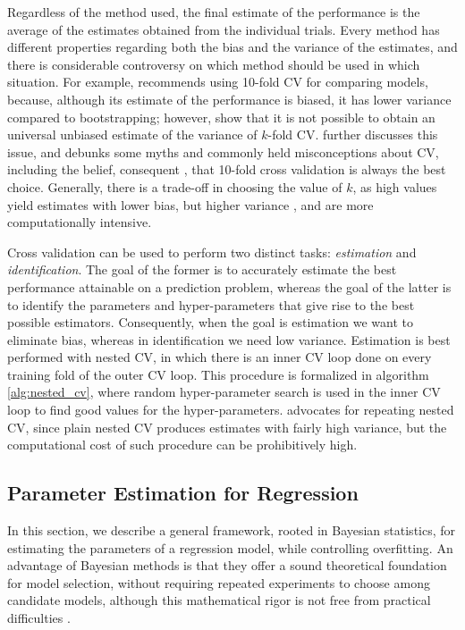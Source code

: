 \documentclass[a4paper,11pt]{kth-mag}
\begin{document}
Regardless of the method used, the final estimate of the performance is the average of the estimates obtained from the individual trials. Every method has different properties regarding both the bias and the variance of the estimates, and there is considerable controversy on which method should be used in which situation. For example, \cite{cv_bootstrap} recommends using 10-fold CV for comparing models, because, although its estimate of the performance is biased, it has lower variance compared to bootstrapping; however, \cite{no_unbiased_cv} show that it is not possible to obtain an universal unbiased estimate of the variance of $k$-fold CV. \cite{cvmyths} further discusses this issue, and debunks some myths and commonly held misconceptions about CV, including the belief, consequent \cite{cv_bootstrap}, that 10-fold cross validation is always the best choice. Generally, there is a trade-off in choosing the value of $k$, as high values yield estimates with lower bias, but higher variance \citep{cv_survey}, and are more computationally intensive.

Cross validation can be used to perform two distinct tasks: \emph{estimation} and \emph{identification}. The goal of the former is to accurately estimate the best performance attainable on a prediction problem, whereas the goal of the latter is to identify the parameters and hyper-parameters that give rise to the best possible estimators. Consequently, when the goal is estimation we want to eliminate bias, whereas in identification we need low variance. Estimation is best performed with nested CV\citep{nested_cv_stone,nested_cv_varma}, in which there is an inner CV loop done on every training fold of the outer CV loop. This procedure is formalized in algorithm \ref{alg:nested_cv}, where random hyper-parameter search \citep{random_search} is used in the inner CV loop to find good values for the hyper-parameters. \cite{cv_pitfalls} advocates for repeating nested CV, since plain nested CV produces estimates with fairly high variance, but the computational cost of such procedure can be prohibitively high.


\subsection{Parameter Estimation for Regression}
\label{sec:regression_fit}

In this section, we describe a general framework, rooted in Bayesian statistics, for estimating the parameters of a regression model, while controlling overfitting. An advantage of Bayesian methods is that they offer a sound theoretical foundation for model selection, without requiring repeated experiments to choose among candidate models, although this mathematical rigor is not free from practical difficulties \citep{bayesian_model_selection, practical_bayesian_model_selection}.
\end{document}
